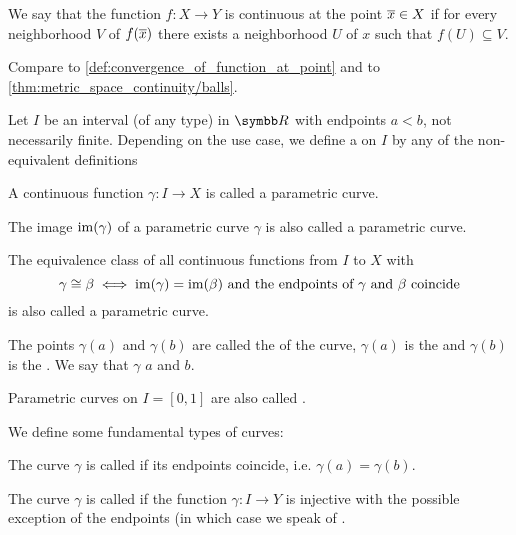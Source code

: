 \begin{definition}\label{def:continuous_function_at_point}
  We say that the function \( f: X \to Y \) is continuous at the point \( \overline{x} \in X \) if for every neighborhood \( V \) of \( f(\overline{x}) \) there exists a neighborhood \( U \) of \( x \) such that \( f(U) \subseteq V \).

  Compare to \cref{def:convergence_of_function_at_point} and to \cref{thm:metric_space_continuity/balls}.
\end{definition}

\begin{definition}\label{def:parametric_curve}
   Let \( I \) be an interval (of any type) in \( \R \) with endpoints \( a < b \), not necessarily finite. Depending on the use case, we define a  on \( I \) by any of the non-equivalent definitions

  \begin{defenum}
     A continuous function \( \gamma: I \to X \) is called a parametric curve.

     The image \( \operatorname{im}(\gamma) \) of a parametric curve \( \gamma \) is also called a parametric curve.

     The equivalence class of all continuous functions from \( I \) to \( X \) with
    \begin{equation*}
      \gamma \cong \beta \iff \operatorname{im}(\gamma) = \operatorname{im}(\beta) \text{ and the endpoints of } \gamma \text{ and } \beta \text{ coincide}
    \end{equation*}
    is also called a parametric curve.
  \end{defenum}

  The points \( \gamma(a) \) and \( \gamma(b) \) are called the  of the curve, \( \gamma(a) \) is the  and \( \gamma(b) \) is the . We say that \( \gamma \)  \( a \) and \( b \).

  Parametric curves on \( I = [0, 1] \) are also called .

  We define some fundamental types of curves:
  \begin{defenum}
     The curve \( \gamma \) is called  if its endpoints coincide, i.e. \( \gamma(a) = \gamma(b) \).

     The curve \( \gamma \) is called  if the function \( \gamma: I \to Y \) is injective with the possible exception of the endpoints (in which case we speak of .
  \end{defenum}
\end{definition}
